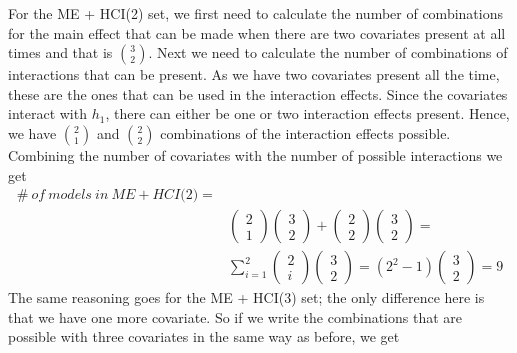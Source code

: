 For the ME + HCI(2) set, we first need to calculate the number of combinations for the main effect that can be made when there are two covariates present at all times and that is $\binom{3}{2}$. Next we need to calculate the number of combinations of interactions that can be present. As we have two covariates present all the time, these are the ones that can be used in the interaction effects. Since the covariates interact with $h_1$, there can either be one or two interaction effects present. Hence, we have $\binom{2}{1}$ and $\binom{2}{2}$ combinations of the interaction effects possible. Combining the number of covariates with the number of possible interactions we get
\begin{equation*}
\begin{aligned}
\#\ of\ models\ in\ ME+HCI\textit{(2)}=\\
& \left( \begin{array}{c}
2 \\ 
1 \end{array}
\right)\left( \begin{array}{c}
3 \\ 
2 \end{array}
\right)+\left( \begin{array}{c}
2 \\ 
2 \end{array}
\right)\left( \begin{array}{c}
3 \\ 
2 \end{array}
\right)=\\
&\sum^2_{i=1}{\left( \begin{array}{c}
2 \\ 
i \end{array}
\right)}\left( \begin{array}{c}
3 \\ 
2 \end{array}
\right)=\left(2^2-1\right)\left( \begin{array}{c}
3 \\ 
2 \end{array}
\right)=9

\end{aligned}
\end{equation*}
The same reasoning goes for the ME + HCI(3) set; the only difference here is that we have one more covariate. So if we write the combinations that are possible with three covariates in the same way as before, we get
